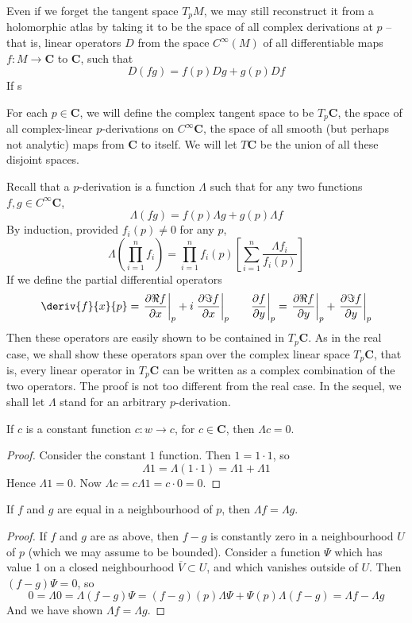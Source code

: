 Even if we forget the tangent space $T_p M$, we may still reconstruct it from a holomorphic atlas by taking it to be the space of all complex derivations at $p$ -- that is, linear operators $D$ from the space $C^\infty (M)$ of all differentiable maps $f:M \to \mathbf{C}$ to $\mathbf{C}$, such that
%
\[ D(fg) = f(p) Dg + g(p) Df \]
%
If s

\begin{definition}
    For each $p \in \mathbf{C}$, we will define the complex tangent space to be $T_p \mathbf{C}$, the space of all complex-linear $p$-derivations on $C^\infty \mathbf{C}$, the space of all smooth (but perhaps not analytic) maps from $\mathbf{C}$ to itself. We will let $T \mathbf{C}$ be the union of all these disjoint spaces.
\end{definition}

Recall that a $p$-derivation is a function $\Lambda$ such that for any two functions $f,g \in C^\infty \mathbf{C}$,
%
\[ \Lambda (fg) = f(p) \Lambda g + g(p) \Lambda f \]
%
By induction, provided $f_i(p) \neq 0$ for any $p$,
%
\[ \Lambda \left(\prod_{i = 1}^n f_i \right) = \prod_{i = 1}^n f_i(p) \left[\sum_{i = 1}^n \frac{\Lambda f_i}{f_i(p)}\right] \]
%
If we define the partial differential operators
%
\[ \deriv{f}{x}{p} = \left.\frac{\partial \Re f}{\partial x}\right|_p + i \left.\frac{\partial \Im f}{\partial x}\right|_p\ \ \ \ \ \left.\frac{\partial f}{\partial y}\right|_p = \left.\frac{\partial \Re f}{\partial y}\right|_p + \left.\frac{\partial \Im f}{\partial y}\right|_p \]
%
Then these operators are easily shown to be contained in $T_p \mathbf{C}$. As in the real case, we shall show these operators span over the complex linear space $T_p \mathbf{C}$, that is, every linear operator in $T_p \mathbf{C}$ can be written as a complex combination of the two operators. The proof is not too different from the real case. In the sequel, we shall let $\Lambda$ stand for an arbitrary $p$-derivation.

\begin{lemma}
    If $c$ is a constant function $c: w \to c$, for $c \in \mathbf{C}$, then $\Lambda c = 0$.
\end{lemma}
\begin{proof}
    Consider the constant $1$ function. Then $1 = 1 \cdotp 1$, so
    \[ \Lambda 1 = \Lambda (1 \cdotp 1) = \Lambda 1 + \Lambda 1 \]
    Hence $\Lambda 1 = 0$. Now $\Lambda c = c \Lambda 1 = c \cdotp 0 = 0$.
\end{proof}

\begin{lemma}
    If $f$ and $g$ are equal in a neighbourhood of $p$, then $\Lambda f = \Lambda g$.
\end{lemma}
\begin{proof}
    If $f$ and $g$ are as above, then $f - g$ is constantly zero in a neighbourhood $U$ of $p$ (which we may assume to be bounded). Consider a function $\Psi$ which has value 1 on a closed neighbourhood $\overline{V} \subset U$, and which vanishes outside of $U$. Then $(f - g) \Psi = 0$, so
    \[ 0 = \Lambda 0 = \Lambda (f - g) \Psi = (f - g)(p) \Lambda \Psi + \Psi(p) \Lambda (f - g) = \Lambda f - \Lambda g \]
    And we have shown $\Lambda f = \Lambda g$.
\end{proof}

